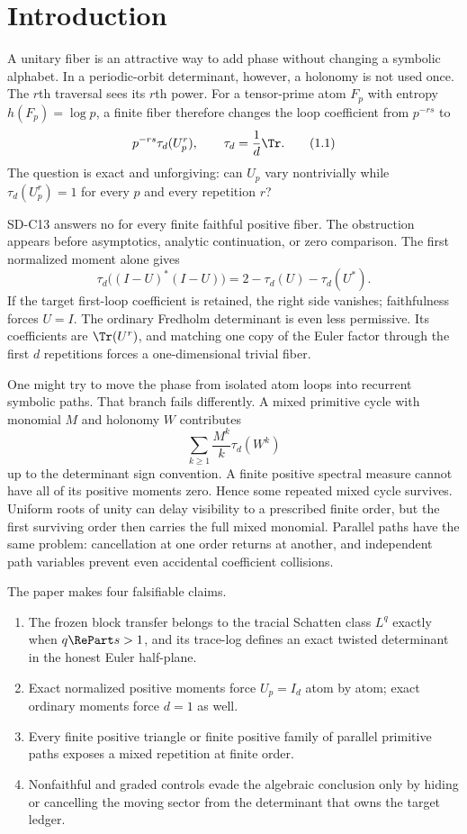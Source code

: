 \section{Introduction}
\label{sec:introduction}

A unitary fiber is an attractive way to add phase without changing a
symbolic alphabet.  In a periodic-orbit determinant, however, a holonomy is
not used once.  The $r$th traversal sees its $r$th power.  For a tensor-prime
atom $F_p$ with entropy $h(F_p)=\log p$, a finite fiber therefore changes the
loop coefficient from $p^{-rs}$ to
\[
 p^{-rs}\tau_d(U_p^r),\qquad
 \tau_d=\frac1d\Tr.                                      \tag{1.1}
\]
The question is exact and unforgiving: can $U_p$ vary nontrivially while
$\tau_d(U_p^r)=1$ for every $p$ and every repetition $r$?

SD-C13 answers no for every finite faithful positive fiber.  The obstruction
appears before asymptotics, analytic continuation, or zero comparison.  The
first normalized moment alone gives
\[
 \tau_d\bigl((I-U)^*(I-U)\bigr)
 =2-\tau_d(U)-\tau_d(U^*) .                              \tag{1.2}
\]
If the target first-loop coefficient is retained, the right side vanishes;
faithfulness forces $U=I$.  The ordinary Fredholm determinant is even less
permissive.  Its coefficients are $\Tr(U^r)$, and matching one copy of the
Euler factor through the first $d$ repetitions forces a one-dimensional
trivial fiber.

One might try to move the phase from isolated atom loops into recurrent
symbolic paths.  That branch fails differently.  A mixed primitive cycle
with monomial $M$ and holonomy $W$ contributes
\[
 \sum_{k\ge1}\frac{M^k}{k}\tau_d(W^k)                  \tag{1.3}
\]
up to the determinant sign convention.  A finite positive spectral measure
cannot have all of its positive moments zero.  Hence some repeated mixed
cycle survives.  Uniform roots of unity can delay visibility to a prescribed
finite order, but the first surviving order then carries the full mixed
monomial.  Parallel paths have the same problem: cancellation at one order
returns at another, and independent path variables prevent even accidental
coefficient collisions.



The paper makes four falsifiable claims.
\begin{enumerate}
 \item The frozen block transfer belongs to the tracial Schatten class
       $L^q$ exactly when $q\RePart s>1$, and its trace-log defines an exact
       twisted determinant in the honest Euler half-plane.
 \item Exact normalized positive moments force $U_p=I_d$ atom by atom;
       exact ordinary moments force $d=1$ as well.
 \item Every finite positive triangle or finite positive family of parallel
       primitive paths exposes a mixed repetition at finite order.
 \item Nonfaithful and graded controls evade the algebraic conclusion only
       by hiding or cancelling the moving sector from the determinant that
       owns the target ledger.
\end{enumerate}


